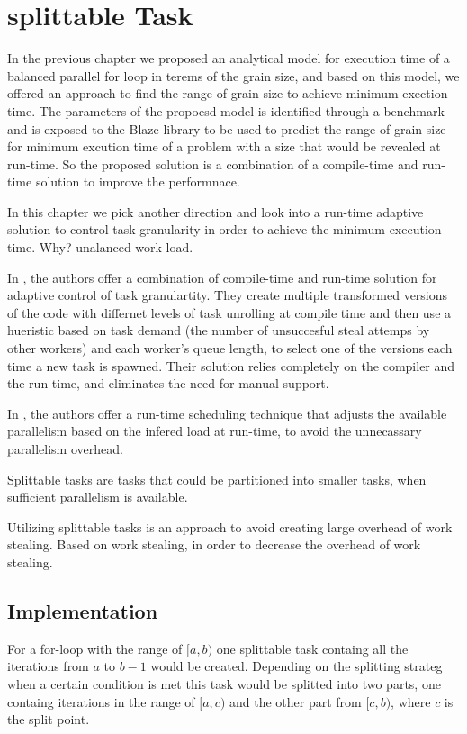 \section{splittable Task}

In the previous chapter we proposed an analytical model for execution time of a balanced parallel for loop in terems of the grain size, and based on this model, we offered an approach to find the range of grain size to achieve minimum exection time. The parameters of the propoesd model is identified through a benchmark and is exposed to the Blaze library to be used to predict the range of grain size for minimum excution time of a problem with a size that would be revealed at run-time. So the proposed solution is a combination of a compile-time and run-time solution to improve the performnace.
  
In this chapter we pick another direction and look into a run-time adaptive solution to control task granularity in order to achieve the minimum execution time. Why? unalanced work load.

In \cite{thoman2013adaptive}, the authors offer a combination of compile-time and run-time solution for adaptive control of task granulartity. They create multiple transformed versions of the code with differnet levels of task unrolling at compile time and then use a hueristic based on task demand (the number of unsuccesful steal attemps by other workers) and each worker's queue length, to select one of the versions each time a new task is spawned\cite{thoman2013adaptive}. Their solution relies completely on the compiler and the run-time, and eliminates the need for manual support.

In \cite{tzannes2014lazy}, the authors offer a run-time scheduling technique that adjusts the available parallelism based on the infered load at run-time, to avoid the unnecassary parallelism overhead. 

Splittable tasks are tasks that could be partitioned into smaller tasks, when sufficient parallelism is available\cite{prell2016embracing}. 

Utilizing splittable tasks is an approach to avoid creating large overhead of work stealing. 
Based on work stealing, in order to decrease the overhead of work stealing. 

\cite{aguilar2019line}


\subsection{Implementation}
For a for-loop with the range of $[a,b)$ one splittable task containg all the iterations from $a$ to $b-1$ would be created. Depending on the splitting strateg when a certain condition is met this task would be splitted into two parts, one containg iterations in the range of $[a,c)$ and the other part from $[c,b)$, where $c$ is the split point.   


